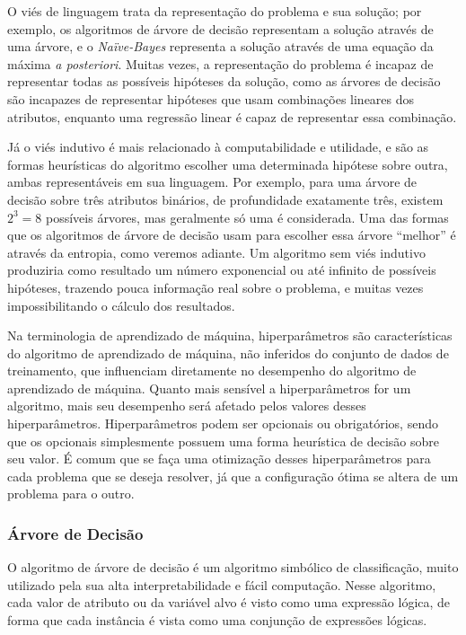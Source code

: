 \documentclass{article}
\begin{document}
O viés de linguagem trata da representação do problema e sua solução;
por exemplo, os algoritmos de árvore de decisão representam a solução através de uma árvore,
e o {\it Naïve-Bayes} representa a solução através de uma equação da máxima {\it a posteriori}.
Muitas vezes, a representação do problema é incapaz de representar todas as possíveis hipóteses da solução,
como as árvores de decisão são incapazes de representar hipóteses que usam combinações lineares dos atributos,
enquanto uma regressão linear é capaz de representar essa combinação.

Já o viés indutivo é mais relacionado à computabilidade e utilidade,
e são as formas heurísticas do algoritmo escolher uma determinada hipótese sobre outra,
ambas representáveis em sua linguagem.
Por exemplo, para uma árvore de decisão sobre três atributos binários, de profundidade exatamente três,
existem $2^3 = 8$ possíveis árvores, mas geralmente só uma é considerada.
Uma das formas que os algoritmos de árvore de decisão usam para escolher essa árvore ``melhor''
é através da entropia, como veremos adiante.
Um algoritmo sem viés indutivo produziria como resultado um número exponencial ou até infinito
de possíveis hipóteses, trazendo pouca informação real sobre o problema,
e muitas vezes impossibilitando o cálculo dos resultados.

Na terminologia de aprendizado de máquina, hiperparâmetros são características do algoritmo de aprendizado de máquina,
não inferidos do conjunto de dados de treinamento, que influenciam diretamente no desempenho do algoritmo de aprendizado de máquina.
Quanto mais sensível a hiperparâmetros for um algoritmo, mais seu desempenho será afetado pelos valores desses hiperparâmetros.
Hiperparâmetros podem ser opcionais ou obrigatórios, sendo que os opcionais simplesmente possuem uma forma heurística
de decisão sobre seu valor.
É comum que se faça uma otimização desses hiperparâmetros para cada problema que se deseja resolver,
já que a configuração ótima se altera de um problema para o outro.


\subsubsection{Árvore de Decisão}

O algoritmo de árvore de decisão é um algoritmo simbólico de classificação,
muito utilizado pela sua alta interpretabilidade e fácil computação.
Nesse algoritmo, cada valor de atributo ou da variável alvo é visto como uma expressão lógica,
de forma que cada instância é vista como uma conjunção de expressões lógicas.
\end{document}
